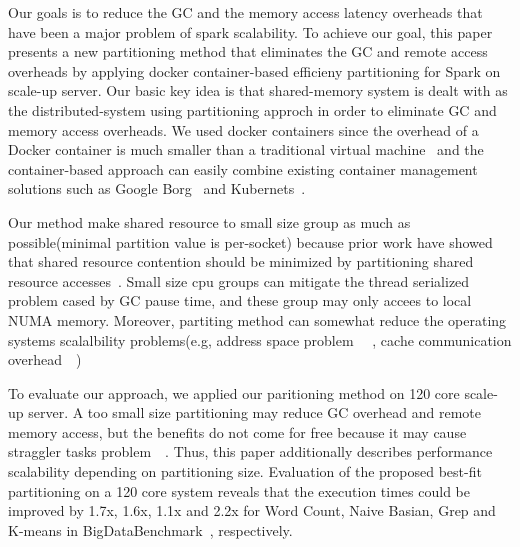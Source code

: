 Our goals is to reduce the GC and the memory access latency overheads that
have been a major problem of spark scalability.
To achieve our goal, this paper presents a new partitioning method that
eliminates the GC and remote access overheads by applying
docker container-based efficieny partitioning for Spark on scale-up
server.
Our basic key idea is that shared-memory system is dealt with as the
distributed-system using partitioning approch in order to eliminate GC and
memory access overheads.
We used docker containers since the overhead of a Docker
container is much smaller than a traditional virtual
machine~\cite{Merkel2014DLL} and the container-based approach can easily combine
existing container management solutions such as Google Borg~\cite{Borg} and
Kubernets~\cite{Kubernetes}.

Our method make shared resource to small size group as much as
possible(minimal partition value is per-socket) because prior work have showed
that shared resource contention should be minimized by partitioning shared
resource accesses~\cite{Qureshi2006UCP}.
Small size cpu groups can mitigate the thread serialized problem cased by GC
pause time, and these group may only accees to local NUMA memory.
Moreover, partiting method can somewhat reduce the operating systems
scalalbility problems(e.g, address space
problem ~\cite{AustinTClements2012RCUBalancedTrees}~\cite{Clements2013RadixVM},
cache communication overhead~\cite{SilasBoydWickizerPth}~\cite{Hendler2010FC})

To evaluate our approach, we applied our paritioning method on 120 core
scale-up server.
A too small size partitioning may reduce GC overhead and remote memory access,
but the benefits do not come for free because it may cause straggler tasks
problem~\cite{Ousterhout2015MSP}~\cite{Ren2015HDS}.
Thus, this paper additionally describes performance scalability
depending on partitioning size.
Evaluation of the proposed best-fit partitioning on a 120 core system
 reveals that the execution times could be improved by 1.7x, 1.6x, 1.1x and 2.2x
 for Word Count, Naive Basian, Grep and K-means in
BigDataBenchmark~\cite{wang2014bigdatabench}, respectively.

